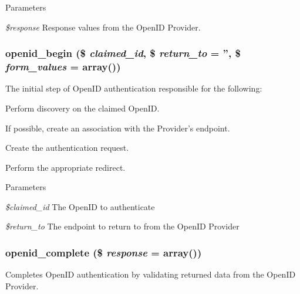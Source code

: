 \begin{DoxyParams}{Parameters}
\item[{\em \$response}]Response values from the OpenID Provider. \end{DoxyParams}
\hypertarget{openid_8module_a09025e6f08d24b6630a5bc95d26d1fcf}{
\subsubsection[{openid\_\-begin}]{\setlength{\rightskip}{0pt plus 5cm}openid\_\-begin (\$ {\em claimed\_\-id}, \/  \$ {\em return\_\-to} = {\ttfamily ''}, \/  \$ {\em form\_\-values} = {\ttfamily array()})}}
\label{openid_8module_a09025e6f08d24b6630a5bc95d26d1fcf}
The initial step of OpenID authentication responsible for the following:
\begin{DoxyItemize}
\item Perform discovery on the claimed OpenID.
\item If possible, create an association with the Provider's endpoint.
\item Create the authentication request.
\item Perform the appropriate redirect.
\end{DoxyItemize}


\begin{DoxyParams}{Parameters}
\item[{\em \$claimed\_\-id}]The OpenID to authenticate \item[{\em \$return\_\-to}]The endpoint to return to from the OpenID Provider \end{DoxyParams}
\hypertarget{openid_8module_a5d4362ca6e1e5f62daa2de3f5b6709f3}{
\subsubsection[{openid\_\-complete}]{\setlength{\rightskip}{0pt plus 5cm}openid\_\-complete (\$ {\em response} = {\ttfamily array()})}}
\label{openid_8module_a5d4362ca6e1e5f62daa2de3f5b6709f3}
Completes OpenID authentication by validating returned data from the OpenID Provider.


